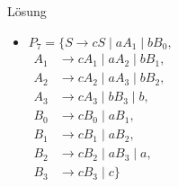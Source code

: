 {
\begin{frame}{Lösung}
        \begin{itemize}
            \item 
                \alert<1>{
                $P_7 = \{S \to cS \mid aA_1 \mid bB_0,$\\
                \vspace*{0.9mm}
                \hspace*{7mm}
                $\begin{aligned}
                A_1 &\to cA_1 \mid aA_2 \mid bB_1,\\
                A_2 &\to cA_2 \mid aA_3 \mid bB_2,\\
                A_3 &\to cA_3 \mid bB_3 \mid b,\\
                B_0 &\to cB_0 \mid aB_1,\\
                B_1 &\to cB_1 \mid aB_2,\\
                B_2 &\to cB_2 \mid aB_3 \mid a,\\
                B_3 &\to cB_3 \mid c\}
                \end{aligned}
                $}
        \end{itemize}
\end{frame}
}
